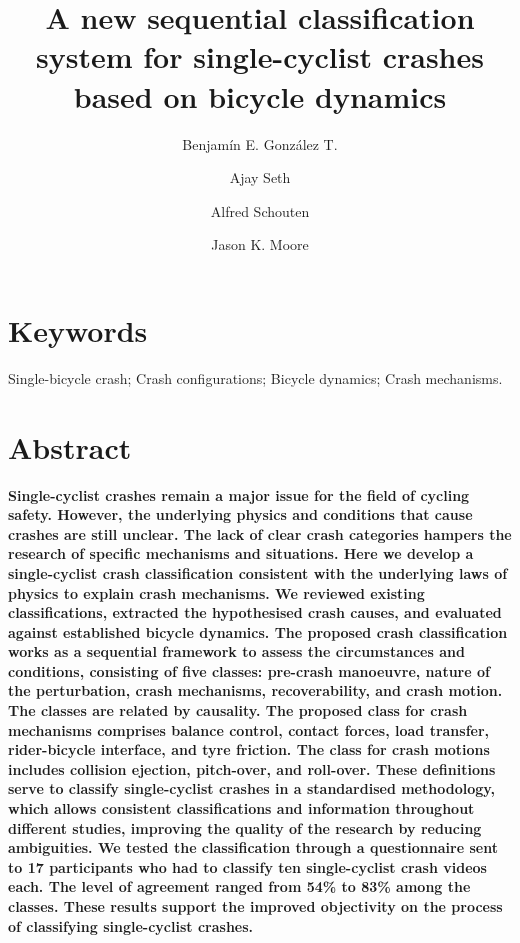 \documentclass{article}
\title{A new sequential classification system for single-cyclist crashes based on bicycle dynamics}
\author[1]{Benjamín E. González T.}
\author[1]{Ajay Seth}
\author[1]{Alfred Schouten}
\author[1]{Jason K. Moore}
\affil[1]{\footnotesize{Department of Biomechanical Engineering, Delft University of Technology, The Netherlands}}
\date{}
\begin{document}

\maketitle

\small

\section*{Keywords}
%
Single-bicycle crash;
%
Crash configurations;
%
Bicycle dynamics;
%
Crash mechanisms.


\section*{Abstract} 
%
\textbf{
Single-cyclist crashes remain a major issue for the field of cycling safety.
%
However, the underlying physics and conditions that cause crashes are still unclear.
%
The lack of clear crash categories hampers the research of specific mechanisms and situations.
%
Here we develop a single-cyclist crash classification consistent with the underlying laws of physics to explain crash mechanisms.
%
We reviewed existing classifications, extracted the hypothesised crash causes, and evaluated against established bicycle dynamics.
%
The proposed crash classification works as a sequential framework to assess the circumstances and conditions, consisting of five classes: pre-crash manoeuvre, nature of the perturbation, crash mechanisms, recoverability, and crash motion.
%
The classes are related by causality.
%
The proposed class for crash mechanisms comprises balance control, contact forces, load transfer, rider-bicycle interface, and tyre friction.
%
The class for crash motions includes collision ejection, pitch-over, and roll-over.
%
These definitions serve to classify single-cyclist crashes in a standardised methodology, which allows consistent classifications and information throughout different studies, improving the quality of the research by reducing ambiguities.
%
We tested the classification through a questionnaire sent to 17 participants who had to classify ten single-cyclist crash videos each.
%
The level of agreement ranged from 54\% to 83\% among the classes.
%
These results support the improved objectivity on the process of classifying single-cyclist crashes.
}


\normalsize
\end{document}
